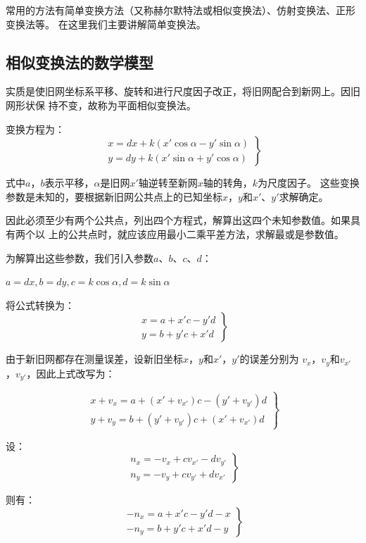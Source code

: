 常用的方法有简单变换方法（又称赫尔默特法或相似变换法）、仿射变换法、正形变换法等。
在这里我们主要讲解简单变换法。

\subsection{相似变换法的数学模型}
实质是使旧网坐标系平移、旋转和进行尺度因子改正，将旧网配合到新网上。因旧网形状保
持不变，故称为平面相似变换法。

变换方程为：
$$\left.
\begin{array}{l}
\textrm{$x=dx + k(x'\cos\alpha - y'\sin\alpha)$} \\
\textrm{$y=dy + k(x'\sin\alpha + y'\cos\alpha)$} 
\end{array}\right\}$$

式中$a$，$b$表示平移，$\alpha$是旧网$x'$轴逆转至新网$x$轴的转角，$k$为尺度因子。
这些变换参数是未知的，要根据新旧网公共点上的已知坐标$x$，$y$和$x'$、$y'$求解确定。

因此必须至少有两个公共点，列出四个方程式，解算出这四个未知参数值。如果具有两个以
上的公共点时，就应该应用最小二乘平差方法，求解最或是参数值。

为解算出这些参数，我们引入参数$a$、$b$、$c$、$d$：

$a=dx, b=dy, c=k\cos\alpha, d=k\sin\alpha$

将公式转换为：
$$\left.
\begin{array}{l}
\textrm{$x = a + x'c - y'd$}\\
\textrm{$y = b + y'c + x'd$}
\end{array}\right\}$$

由于新旧网都存在测量误差，设新旧坐标$x$，$y$和$x'$，$y'$的误差分别为
$v_x$，$v_y$和$v_{x'}$，$v_{y'}$，因此上式改写为：

$$\left.\begin{array}{l}
\textrm{$x + v_x = a + (x'+v_{x'})c - (y'+v_{y'})d$} \\
\textrm{$y + v_y = b + (y'+v_{y'})c + (x'+v_{x'})d$}
\end{array}\right\}$$

设：
$$\left.\begin{array}{l}
\textrm{$n_x = -v_x + cv_{x'} - dv_{y'}$} \\
\textrm{$n_y = -v_y + cv_{y'} + dv_{x'}$}
\end{array}\right\}$$

则有：
$$\left.\begin{array}{l}
\textrm{$-n_x = a + x'c - y'd - x$} \\
\textrm{$-n_y = b + y'c + x'd - y$}
\end{array}\right\}$$

